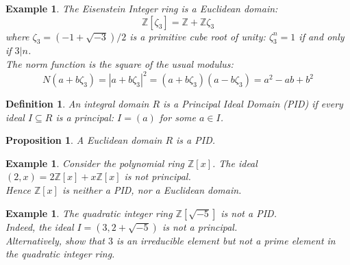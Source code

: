 \documentclass[a4paper,8pt]{article}
\newcommand{\Z}{\mathbb{Z}}
\newcommand{\abs}[1]{\left\lvert#1\right\rvert}
\newcommand{\hlt}[1]{\textit{{\color{blue}#1}}}
\theoremstyle{theorem}
\newtheorem{proposition}[theorem]{Proposition}
\newtheorem{definition}[theorem]{Definition}
\newtheorem{example}[theorem]{Example}
\begin{document}
\begin{example}
The \hlt{Eisenstein Integer} ring is a Euclidean domain:
\begin{equation}
\Z [\zeta_3] = \Z + \Z \zeta_3 \nonumber
\end{equation}
where $\zeta_3 = (-1 + \sqrt{-3}) /2 $ is a primitive cube root of unity: $\zeta_3^n = 1$ if and only if $3 | n$.\\
The norm function is the square of the usual modulus:
\begin{equation}
N(a+b\zeta_3) = \abs{a+b\zeta_3}^2 = (a+b\zeta_3)(a-b\zeta_3) = a^2 - ab + b^2 \nonumber
\end{equation}
\end{example}

\begin{definition}
An integral domain $R$ is a \hlt{Principal Ideal Domain (PID)} if every ideal $I \subseteq R$ is a principal: $I=(a)$ for some $a \in I$.
\end{definition}

\begin{proposition}
A Euclidean domain $R$ is a PID.
\end{proposition}

\begin{example}
Consider the polynomial ring $\Z [x]$. The ideal $(2,x) = 2\Z [x] + x \Z [x]$ is not principal.\\
Hence $\Z [x]$ is neither a PID, nor a Euclidean domain.
\end{example}

\begin{example}
The quadratic integer ring $\Z [\sqrt{-5}]$ is not a PID.\\
Indeed, the ideal $I = (3, 2+\sqrt{-5})$ is not a principal.\\
Alternatively, show that $3$ is an irreducible element but not a prime element in the quadratic integer ring. 
\end{example}
\end{document}

